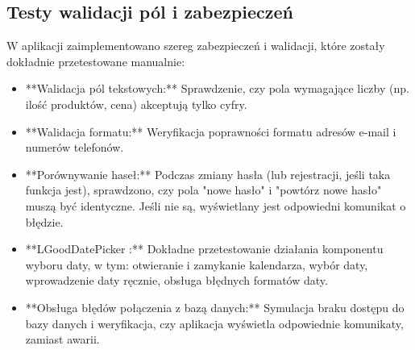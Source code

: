 \subsection{Testy walidacji pól i zabezpieczeń}
W aplikacji zaimplementowano szereg zabezpieczeń i walidacji, które zostały dokładnie przetestowane manualnie:
\begin{itemize}
    \item **Walidacja pól tekstowych:** Sprawdzenie, czy pola wymagające liczby (np. ilość produktów, cena) akceptują tylko cyfry.
    \item **Walidacja formatu:** Weryfikacja poprawności formatu adresów e-mail i numerów telefonów.
    \item **Porównywanie haseł:** Podczas zmiany hasła (lub rejestracji, jeśli taka funkcja jest), sprawdzono, czy pola "nowe hasło" i "powtórz nowe hasło" muszą być identyczne. Jeśli nie są, wyświetlany jest odpowiedni komunikat o błędzie.
    \item **LGoodDatePicker \cite{LGoodDatePicker}:** Dokładne przetestowanie działania komponentu wyboru daty, w tym: otwieranie i zamykanie kalendarza, wybór daty, wprowadzenie daty ręcznie, obsługa błędnych formatów daty.
    \item **Obsługa błędów połączenia z bazą danych:** Symulacja braku dostępu do bazy danych i weryfikacja, czy aplikacja wyświetla odpowiednie komunikaty, zamiast awarii.
\end{itemize}